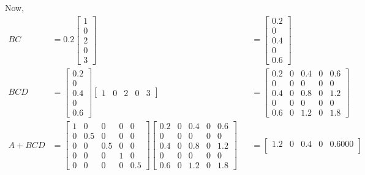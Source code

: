 \documentclass[a4paper]{article}
\begin{document}
\begin{qalist}
			Now, 
			\begin{align}
				BC &= 0.2 \begin{bmatrix}1 \\ 0 \\ 2 \\ 0 \\3\end{bmatrix} &&= \begin{bmatrix}0.2 \\ 0 \\ 0.4 \\ 0 \\ 0.6\end{bmatrix} \\
				BCD &= \begin{bmatrix}0.2 \\ 0 \\ 0.4 \\ 0 \\ 0.6\end{bmatrix} \begin{bmatrix}1 & 0 & 2 & 0 &3\end{bmatrix} &&= 
					\begin{bmatrix}
						0.2 & 0 & 0.4 & 0 & 0.6 \\
						0 & 0 & 0 & 0 & 0 \\
						0.4 & 0 & 0.8 & 0 & 1.2 \\
						0 & 0 & 0 & 0 & 0 \\
						0.6 & 0 & 1.2 & 0 & 1.8
					\end{bmatrix} \\
				A + BCD &=  \begin{bmatrix}
					1 & 0 & 0 & 0 & 0 \\
					0 & 0.5 & 0 & 0 & 0 \\
					0 & 0 & 0.5 & 0 & 0 \\
					0 & 0 & 0 & 1 & 0 \\
					0 & 0 & 0 & 0 & 0.5
				\end{bmatrix} \begin{bmatrix}
						0.2 & 0 & 0.4 & 0 & 0.6 \\
						0 & 0 & 0 & 0 & 0 \\
						0.4 & 0 & 0.8 & 0 & 1.2 \\
						0 & 0 & 0 & 0 & 0 \\
						0.6 & 0 & 1.2 & 0 & 1.8
					\end{bmatrix} && = \begin{bmatrix}
						1.2 & 0 & 0.4 & 0 & 0.6000 \\

\end{bmatrix}
\end{align}
\end{qalist}
\end{document}
